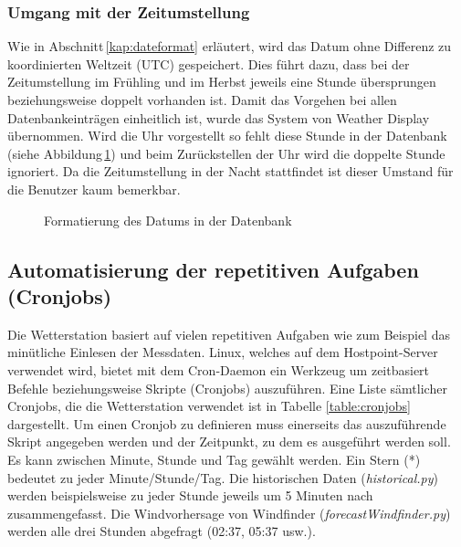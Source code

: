 \subsubsection{Umgang mit der Zeitumstellung}
Wie in Abschnitt\,\ref{kap:dateformat} erläutert, wird das Datum ohne Differenz zu koordinierten Weltzeit (UTC) gespeichert. Dies führt dazu, dass bei der Zeitumstellung im Frühling und im Herbst jeweils eine Stunde übersprungen beziehungsweise doppelt vorhanden ist. Damit das Vorgehen bei allen Datenbankeinträgen einheitlich ist, wurde das System von Weather Display übernommen. Wird die Uhr vorgestellt so fehlt diese Stunde in der Datenbank (siehe Abbildung\,\ref{img:sommerzeit}) und beim Zurückstellen der Uhr wird die doppelte Stunde ignoriert. Da die Zeitumstellung in der Nacht stattfindet ist dieser Umstand für die Benutzer kaum bemerkbar.

\begin{figure}[htbp!]
	\centering
	\caption{Formatierung des Datums in der Datenbank}
	\label{img:sommerzeit}
\end{figure}


\subsection{Automatisierung der repetitiven Aufgaben (Cronjobs)}


Die Wetterstation basiert auf vielen repetitiven Aufgaben wie zum Beispiel das minütliche Einlesen der Messdaten. Linux, welches auf dem Hostpoint-Server verwendet wird, bietet mit dem Cron-Daemon ein Werkzeug um zeitbasiert Befehle beziehungsweise Skripte (Cronjobs) auszuführen. Eine Liste sämtlicher Cronjobs, die die Wetterstation verwendet ist in Tabelle \ref{table:cronjobs} dargestellt. Um einen Cronjob zu definieren muss einerseits das auszuführende Skript angegeben werden und der Zeitpunkt, zu dem es ausgeführt werden soll. Es kann zwischen Minute, Stunde und Tag gewählt werden. Ein Stern (*) bedeutet zu jeder Minute/Stunde/Tag. Die historischen Daten (\emph{historical.py}) werden beispielsweise zu jeder Stunde jeweils um 5 Minuten nach zusammengefasst. Die Windvorhersage von Windfinder (\emph{forecastWindfinder.py}) werden alle drei Stunden abgefragt (02:37, 05:37 usw.).


